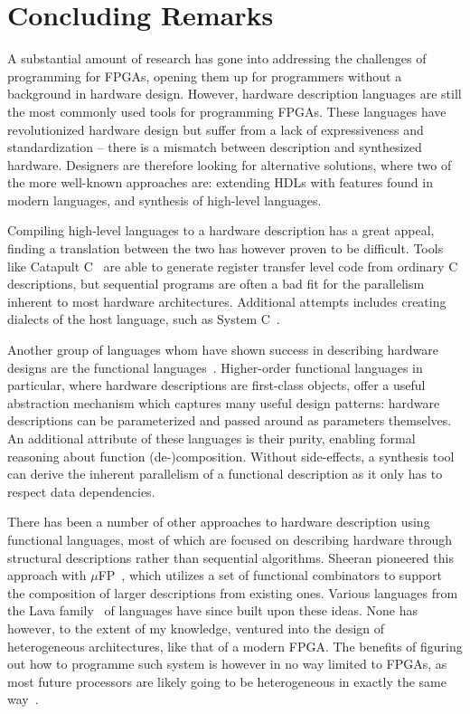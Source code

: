\documentclass[../paper.tex]{subfiles}
\begin{document}
\chapter{Concluding Remarks}
\label{related}

A substantial amount of research has gone into addressing the challenges of programming for FPGAs, opening them up for programmers without a background in hardware design. However, hardware description languages are still the most commonly used tools for programming FPGAs. These languages have revolutionized hardware design but suffer from a lack of expressiveness and standardization -- there is a mismatch between description and synthesized hardware. Designers are therefore looking for alternative solutions, where two of the more well-known approaches are: extending HDLs with features found in modern languages, and synthesis of high-level languages.

Compiling high-level languages to a hardware description has a great appeal, finding a translation between the two has however proven to be difficult. Tools like Catapult C~\cite{graphics2008} are able to generate register transfer level code from ordinary C descriptions, but sequential programs are often a bad fit for the parallelism inherent to most hardware architectures. Additional attempts includes creating dialects of the host language, such as System C~\cite{ghenassia2005}.

Another group of languages whom have shown success in describing hardware designs are the functional languages~\cite{sheeran2005}. Higher-order functional languages in particular, where hardware descriptions are first-class objects, offer a useful abstraction mechanism which captures many useful design patterns: hardware descriptions can be parameterized and passed around as parameters themselves. An additional attribute of these languages is their purity, enabling formal reasoning about function (de-)composition. Without side-effects, a synthesis tool can derive the inherent parallelism of a functional description as it only has to respect data dependencies.

There has been a number of other approaches to hardware description using functional languages, most of which are focused on describing hardware through structural descriptions rather than sequential algorithms. Sheeran pioneered this approach with $\mu$FP~\cite{sheeran1984}, which utilizes a set of functional combinators to support the composition of larger descriptions from existing ones. Various languages from the Lava family~\cite{bjesse1998, gill2010} of languages have since built upon these ideas. None has however, to the extent of my knowledge, ventured into the design of heterogeneous architectures, like that of a modern FPGA. The benefits of figuring out how to programme such system is however in no way limited to FPGAs, as most future processors are likely going to be heterogeneous in exactly the same way~\cite{sheeran2015}.
\end{document}
